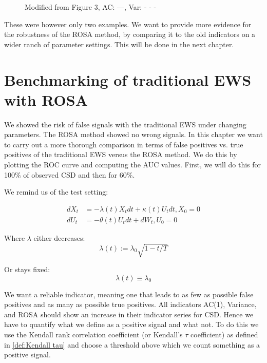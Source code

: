 \documentclass[%
thesis=student,%
coverpage=false,%
titlepage=false,%
headmarks=true, %
english,%
font=libertine, %
math=newpxtx, %
BCOR=5mm,%
coverBCOR=11mm%
]{tumbook}
\begin{document}
\begin{figure}
\begin{minipage}{0.49\textwidth}
    \end{minipage}
    \begin{minipage}{\textwidth}
    \centering
    \caption{Modified from \cite{Morr:2024} Figure 3, AC: ---, Var: - - -}
    \label{false negative example}
    \end{minipage}    
\end{figure}


These were however only two examples. We want to provide more evidence for the robustness of the ROSA method, by comparing it to the old indicators on a wider ranch of parameter settings. This will be done in the next chapter.
    


\chapter{Benchmarking of traditional EWS with ROSA}

We showed the risk of false signals with the traditional EWS under changing parameters.
The ROSA method showed no wrong signals.
In this chapter we want to carry out a more thorough comparison in terms of false positives vs. true positives of the traditional EWS versus the ROSA method. We do this by plotting the ROC curve and computing the AUC values. First, we will do this for 100\% of observed CSD and then for 60\%.

We remind us of the test setting: 

\begin{subequations}
    \begin{align*}
        dX_{t} &= -\lambda(t) X_{t}dt + \kappa(t) U_{t}dt, X_{0} = 0 \\
        dU_{t} &= -\theta(t) U_{t}dt + dW_{t}, U_{0} = 0
    \end{align*}
\end{subequations}

Where $\lambda$ either decreases: 
    \[
    \lambda(t) := \lambda_{0}\sqrt{1-t/T}
    \]

Or stays fixed: 
    \[
    \lambda(t)\equiv\lambda_{0}
    \]

We want a reliable indicator, meaning one that leads to as few as possible false positives and as many as possible true positives. All indicators AC(1), Variance, and ROSA should show an increase in their indicator series for CSD. Hence we have to quantify what we define as a positive signal and what not. To do this we use the Kendall rank correlation coefficient (or Kendall's $\tau$ coefficient) as defined in \ref{def:Kendall tau} and choose a threshold above which we count something as a positive signal. 
\end{document}
